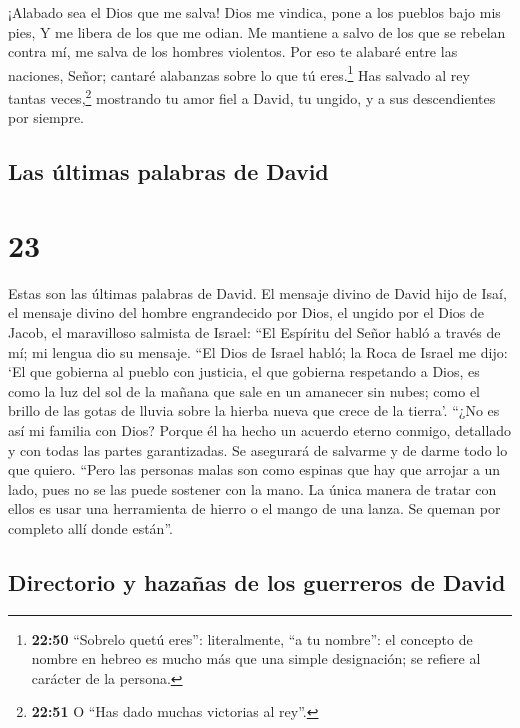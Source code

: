 ¡Alabado sea el Dios que me salva!  Dios me vindica, pone
a los pueblos bajo mis pies,  Y me libera de los que me
odian. Me mantiene a salvo de los que se rebelan contra mí, me salva de
los hombres violentos.  Por eso te alabaré entre las
naciones, Señor; cantaré alabanzas sobre lo que tú eres.\footnote{\textbf{22:50}
  ``Sobrelo quetú eres'': literalmente, ``a tu nombre'': el concepto de
  nombre en hebreo es mucho más que una simple designación; se refiere
  al carácter de la persona.}  Has salvado al rey tantas
veces,\footnote{\textbf{22:51} O ``Has dado muchas victorias al rey''.}
mostrando tu amor fiel a David, tu ungido, y a sus descendientes por
siempre.

\hypertarget{las-uxfaltimas-palabras-de-david}{%
\subsection{Las últimas palabras de
David}\label{las-uxfaltimas-palabras-de-david}}

\hypertarget{section-22}{%
\section{23}\label{section-22}}

 Estas son las últimas palabras de David. El mensaje
divino de David hijo de Isaí, el mensaje divino del hombre engrandecido
por Dios, el ungido por el Dios de Jacob, el maravilloso salmista de
Israel:  ``El Espíritu del Señor habló a través de mí; mi
lengua dio su mensaje.  ``El Dios de Israel habló; la Roca
de Israel me dijo: `El que gobierna al pueblo con justicia, el que
gobierna respetando a Dios,  es como la luz del sol de la
mañana que sale en un amanecer sin nubes; como el brillo de las gotas de
lluvia sobre la hierba nueva que crece de la tierra'. 
``¿No es así mi familia con Dios? Porque él ha hecho un acuerdo eterno
conmigo, detallado y con todas las partes garantizadas. Se asegurará de
salvarme y de darme todo lo que quiero.  ``Pero las
personas malas son como espinas que hay que arrojar a un lado, pues no
se las puede sostener con la mano.  La única manera de
tratar con ellos es usar una herramienta de hierro o el mango de una
lanza. Se queman por completo allí donde están''.

\hypertarget{directorio-y-hazauxf1as-de-los-guerreros-de-david}{%
\subsection{Directorio y hazañas de los guerreros de
David}\label{directorio-y-hazauxf1as-de-los-guerreros-de-david}}

